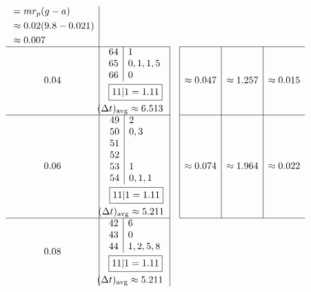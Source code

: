 \documentclass[12pt, A4]{article}
\newcommand{\avg}[1]{#1_{\mathrm{avg}}}
\begin{document}
\[\begin{array}{c|c|c|c|c|c}
\begin{aligned}
							&= mr_p(g - a) \\
							&\approx 0.02(9.8 - 0.021) \\
							&\approx 0.007
					\end{aligned} \\\cline{1-2} \cline{4-6}
				0.04 &
					\begin{aligned}
						&\begin{array}{r|l}
							64 & 1 \\
							65 & 0, 1, 1, 5 \\
							66 & 0
						\end{array} \\
						&\hspace{1.7mm}\boxed{11|1 = 1.11} \\
						&\hspace{-2.45mm}\avg{(\Delta t)} \approx 6.513
					\end{aligned} &&
					\approx 0.047 &
					\approx 1.257 &
					\approx 0.015 \\\cline{1-2} \cline{4-6} 
				0.06 &
					\begin{aligned}
						&\begin{array}{r|l}
							49 & 2 \\
							50 & 0, 3 \\
							51 & \\
							52 & \\
							53 & 1 \\
							54 & 0, 1, 1
						\end{array} \\
						&\hspace{1.65mm}\boxed{11|1 = 1.11} \\
						&\hspace{-2.47mm}\avg{(\Delta t)} \approx 5.211
					\end{aligned} &&
					\approx 0.074 &
					\approx 1.964 &
					\approx 0.022 \\\cline{1-2} \cline{4-6}
				0.08 &
					\begin{aligned}
						&\begin{array}{r|l}
							42 & 6 \\
							43 & 0 \\
							44 & 1, 2, 5, 8
						\end{array} \\
						&\hspace{1.7mm}\boxed{11|1 = 1.11} \\
						&\hspace{-2.5mm}\avg{(\Delta t)} \approx 5.211

\end{aligned}
\end{array}\]
\end{document}
